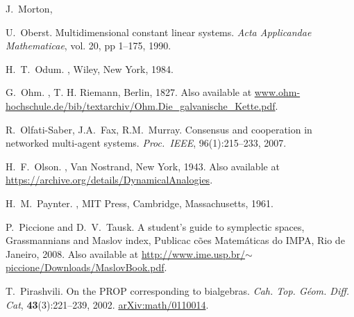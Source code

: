 \begin{thebibliography}{RSW00}
     J.\ Morton, 

    U.\ Oberst.
    \newblock Multidimensional constant linear systems.
    \newblock \emph{Acta Applicandae Mathematicae}, vol. 20, pp 1--175, 1990.

    H.\ T.\ Odum.
    , Wiley, New York, 1984.

    G.\ Ohm.
    ,
    T. H. Riemann, Berlin, 1827.
    \newblock Also available at
    \href{http://www.ohm-hochschule.de/bib/textarchiv/Ohm.Die_galvanische_Kette.pdf}{www.ohm-hochschule.de/bib/textarchiv/Ohm.Die\_galvanische\_Kette.pdf}.

    R.\ Olfati-Saber, J.A.\ Fax, R.M.\ Murray.
    \newblock Consensus and cooperation in networked multi-agent systems.
    \newblock \emph{Proc.\ IEEE}, 96(1):215--233, 2007.

    H.\ F.\ Olson.
    , Van
    Nostrand, New York, 1943.
    \newblock Also available at 
    \href{https://archive.org/details/DynamicalAnalogies}
    {https://archive.org/details/DynamicalAnalogies}.


    H.\ M.\ Paynter.
    , MIT Press, Cambridge, Massachusetts, 1961.


    P.\ Piccione and D.\ V.\ Tausk.
    \newblock A student's guide to symplectic
    spaces, Grassmannians and Maslov index, Publicac c\~oes Matem\'aticas do
    IMPA, Rio de Janeiro, 2008.
    \newblock Also available at
    \href{http://www.ime.usp.br/~piccione/Downloads/MaslovBook.pdf}
    {http://www.ime.usp.br/$\sim$piccione/Downloads/MaslovBook.pdf}.

    T.\ Pirashvili.
    \newblock On the PROP corresponding to bialgebras.
    \newblock 
    \emph{Cah. Top. G\'{e}om. Diff. Cat}, {\bf 43}(3):221--239, 2002.
    \newblock 
    \href{http://arxiv.org/abs/math/0110014}{arXiv:math/0110014}.


\end{thebibliography}
